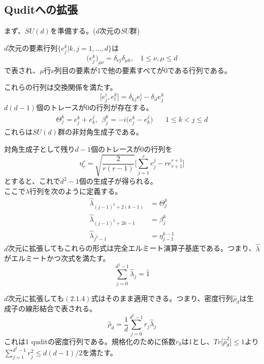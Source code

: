 \documentclass[11pt,a4j,notitlepage]{jreport}
\begin{document}
	\subsection{Quditへの拡張}

	まず、$SU(d)$を準備する。($d$次元の$SU$群)

	$d$次元の要素行列$\{ e_j^k|k,j=1,...,d \}$は
	\begin{equation}
		\big( e_j^k \big) _{\mu \nu} = \delta_{\nu j} \delta_{\mu k}, \ \ \ \ 1 \leq \nu, \mu \leq d
	\end{equation}
	で表され、$\mu$行$\nu$列目の要素が1で他の要素すべてが0である行列である。

	これらの行列は交換関係を満たす。
	\begin{equation}
		\big[ e_j^i, e_l^k \big] = \delta_{kj} e_l^i - \delta_{il} e_j^k
	\end{equation}
	$d(d-1)$個のトレースが0の行列が存在する。
	\begin{equation}
		\begin{aligned}
			\Theta_j^k = e_j^k + e_k^j, \ \ \beta_j^k = -i \big( e_j^k - e_k^j \big) \ \ \ \ \ \ \ \ 1 \leq k < j \leq d
		\end{aligned}
	\end{equation}
	これらは$SU(d)$群の非対角生成子である。

	対角生成子として残り$d-1$個のトレースが0の行列を
	\begin{equation}
		\eta_r^r = \sqrt{\frac{2}{r(r-1)}} \Biggl[ \sum_{j=1}^r e_j^j - r e_{r+1}^{r+1} \Biggr]
	\end{equation}
	とすると、これで$d^2-1$個の生成子が得られる。\\
	ここで$\lambda$行列を次のように定義する。
	\begin{equation}
		\begin{aligned}
			\hat{\lambda}_{(j-1)^2 + 2(k-1)} &= \Theta_j^k\\
			\hat{\lambda}_{(j-1)^2 + 2k-1} &= \beta_j^k\\
			\hat{\lambda}_{j^2-1} &= \eta_{j-1}^{k-1}
		\end{aligned}
	\end{equation}
	$d$次元に拡張してもこれらの形式は完全エルミート演算子基底である。つまり、$\hat{\lambda}$がエルミートかつ次式を満たす。
	\begin{equation}
		\sum_{j=0}^{d^2 - 1} \hat{\lambda}_j = \hat{1}
	\end{equation}

	$d$次元に拡張しても$(2.1.4)$式はそのまま適用できる。つまり、密度行列$\hat{\rho}_d$は生成子の線形結合で表される。
	\begin{equation}
		\hat{\rho}_d = \frac{1}{d} \sum_{j=0}^{d^2 - 1} r_j \hat{\lambda}_j
	\end{equation}
	これは1 quditの密度行列である。規格化のために係数$r_0$は1とし、$Tr \big[ \hat{\rho}_d^2 \big] \leq 1$より$\sum_{j=1}^{d^2 - 1} r_j^2 \leq d(d-1)/2$を満たす。
\end{document}
